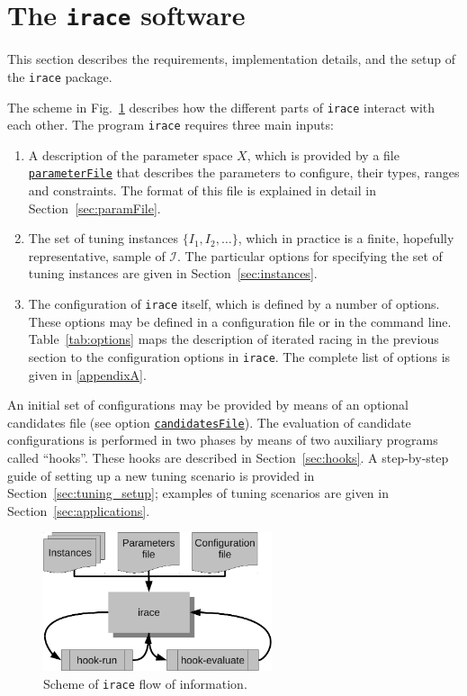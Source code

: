 \documentclass[a4paper]{article}
\newcommand{\irace}{\texttt{irace}\xspace}
\newcommand{\parameter}[1]{\hyperlink{opt:#1}{\texttt{#1}}}
\begin{document}
\section{The \irace software}\label{sec:setup}

This section describes the requirements, implementation details, and
the setup of the \irace package.


The scheme in Fig.~\ref{fig:irace-scheme} describes how the different
parts of \irace interact with each other. The program \irace requires
three main inputs:

\begin{enumerate}
\item A description of the parameter space $X$, which is provided by a
  file \parameter{parameterFile} that describes the parameters to
  configure, their types, ranges and constraints. The format of this
  file is explained in detail in Section~\ref{sec:paramFile}.

\item The set of tuning instances $\{I_1, I_2, \dotsc\}$, which in
  practice is a finite, hopefully representative, sample of
  $\mathcal{I}$. The particular options for specifying the set of
  tuning instances are given in Section~\ref{sec:instances}.

\item The configuration of \irace itself, which is defined by a number
  of options. These options may be defined in a configuration file or
  in the command line. Table~\ref{tab:options} maps the description of
  iterated racing in the previous section to the configuration options
  in \irace. The complete list of options is given in
  \autoref{appendixA}.
\end{enumerate}

An initial set of configurations may be provided by means of an
optional candidates file (see option \parameter{candidatesFile}). The
evaluation of candidate configurations is performed in two phases by
means of two auxiliary programs called ``hooks''. These hooks are
described in Section~\ref{sec:hooks}. A step-by-step guide of setting
up a new tuning scenario is provided in
Section~\ref{sec:tuning_setup}; examples of tuning scenarios are
given in Section~\ref{sec:applications}.


\begin{figure}[tbp]
  \centering
  \includegraphics[width=0.6\textwidth]{irace-scheme-crop}
  \caption{Scheme of \irace flow of information.}
\label{fig:irace-scheme}
\end{figure}
\end{document}
